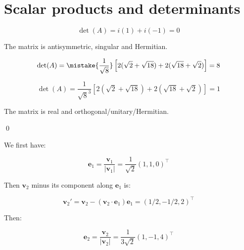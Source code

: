 \documentclass[12pt]{article}
\begin{document}



\pagebreak
\section*{Scalar products and determinants}




\begin{equation}
    \det(A) = i(1) + i(-1) = 0
\end{equation}

The matrix is antisymmetric, singular and Hermitian.


\begin{equation}
    \det(A) = \mistake{\frac{1}{\sqrt{8}}} \left[ 2(\sqrt{2} + \sqrt{18}) + 2(\sqrt{18} + \sqrt{2}) \right] = 8
\end{equation}

\begin{correction}
    \begin{equation}
        \det(A) = \frac{1}{\sqrt{8}^{3}} \left[ 2(\sqrt{2} + \sqrt{18}) + 2(\sqrt{18} + \sqrt{2}) \right] = 1
    \end{equation}

    The matrix is real and orthogonal/unitary/Hermitian.
\end{correction}
\qed


We first have:

\begin{equation}
    \mathbf{e}_{1} = \frac{\mathbf{v}_{1}}{\left\lvert \mathbf{v}_{1} \right\rvert} = \frac{1}{\sqrt{2}} (1, 1, 0)^{\intercal}
\end{equation}

Then $\mathbf{v}_{2}$ minus its component along $\mathbf{e}_{1}$ is:

\begin{equation}
    \mathbf{v}_{2}' = \mathbf{v}_{2} - (\mathbf{v}_{2} \cdot \mathbf{e}_{1}) \mathbf{e}_{1} = (1/2, -1/2, 2)^{\intercal}
\end{equation}

Then:

\begin{equation}
    \mathbf{e}_{2} = \frac{\mathbf{v}_{2}}{\left\lvert \mathbf{v}_{2} \right\rvert} = \frac{1}{3\sqrt{2}} (1, -1, 4)^{\intercal}
\end{equation}
\end{document}
